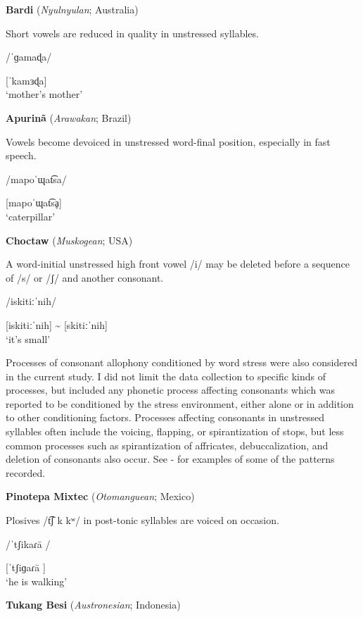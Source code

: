 \ea\label{ex:5.15}
  \textbf{Bardi} (\textit{Nyulnyulan}; Australia)

Short vowels are reduced in quality in unstressed syllables.

/\textsf{ˈ}ɡamaɖa/

[\textsf{ˈ}kamɜɖa]\\
\glt ‘mother’s mother’
\citep[88-90]{Bowern2012}
\z

\ea\label{ex:5.16}
  \textbf{Apurinã} (\textit{Arawakan}; Brazil)

Vowels become devoiced in unstressed word-final position, especially in fast speech.

/mapoˈɰat͡sa/

[mapoˈɰat͡sḁ]\\
\glt ‘caterpillar’
\citep[60-1]{Facundes2000}
\z

\ea\label{ex:5.17}
  \textbf{Choctaw} (\textit{Muskogean}; USA)

A word-initial unstressed high front vowel /i/ may be deleted before a sequence of /s/ or /ʃ/ and another consonant.

/iskitiːˈnih/

[iskitiːˈnih] {\textasciitilde} [skitiːˈnih]\\
\glt ‘it’s small’
\citep[19]{Broadwell2006}
\z

  Processes of consonant allophony conditioned by word stress were also considered in the current study. I did not limit the data collection to specific kinds of processes, but included any phonetic process affecting consonants which was reported to be conditioned by the stress environment, either alone or in addition to other conditioning factors. Processes affecting consonants in unstressed syllables often include the voicing, flapping, or spirantization of stops, but less common processes such as spirantization of affricates, debuccalization, and deletion of consonants also occur. See - for examples of some of the patterns recorded.

\ea\label{ex:5.18}
  \textbf{Pinotepa Mixtec} (\textit{Otomanguean}; Mexico)

Plosives /t͡ʃ k kʷ/ in post-tonic syllables are voiced on occasion.

/ˈtʃikaɾa\={} /

[ˈtʃiɡaɾa\={} ]\\
\glt ‘he is walking’
\citep[5]{Bradley1970}
\z

\ea\label{ex:5.19}
  \textbf{Tukang Besi} (\textit{Austronesian}; Indonesia)

